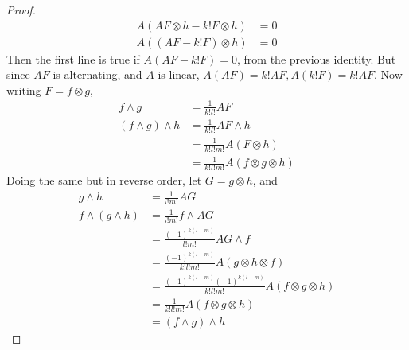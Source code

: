 \documentclass[12pt]{article}
\begin{document}
\begin{proof}
\begin{align*}
        A(AF \otimes h - k!F \otimes h) &= 0 \\
        A((AF - k!F) \otimes h) &= 0
    \end{align*}
    Then the first line is true if $A(AF - k!F) = 0$, from the previous identity. But since $AF$ is alternating, and $A$ is linear, $A(AF) = k!AF, A(k!F) = k!AF$. Now writing $F = f \otimes g$,
    \begin{align*}
        f \wedge g &= \frac{1}{k!l!} AF \\
        (f \wedge g) \wedge h &= \frac{1}{k!l!} AF \wedge h \\
                              &= \frac{1}{k!l!m!} A(F \otimes h) \\
                              &= \frac{1}{k!l!m!} A(f \otimes g \otimes h)
    \end{align*}
    Doing the same but in reverse order, let $G = g \otimes h$, and
    \begin{align*}
        g \wedge h &= \frac{1}{l!m!}AG \\
        f \wedge (g \wedge h) &= \frac{1}{l!m!} f \wedge AG \\
                              &= \frac{(-1)^{k(l+m)}}{l!m!} AG \wedge f \\
                              &= \frac{(-1)^{k(l+m)}}{k!l!m!} A(g \otimes h \otimes f) \\
                              &= \frac{(-1)^{k(l+m)}(-1)^{k(l+m)}}{k!l!m!} A(f \otimes g \otimes h) \\
                              &= \frac{1}{k!l!m!} A(f \otimes g \otimes h) \\
                              &= (f \wedge g) \wedge h
    \end{align*}
\end{proof}
\end{document}
